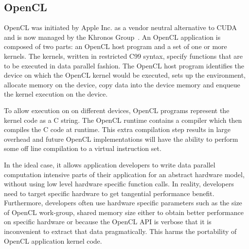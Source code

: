 
\subsection{OpenCL}

OpenCL was initiated by Apple Inc. as a vendor neutral alternative
to CUDA and is now managed by the Khronos Group~\cite{Khronos:url}.
An OpenCL application is composed of two parts: an OpenCL host program and a
set of one or more kernels. The kernels, written in restricted C99 syntax,
specify functions that are to be executed in data parallel fashion. The OpenCL
host program identifies the device on which the OpenCL kernel would be
executed, sets up the environment, allocate memory on the device, copy data
into the device memory and enqueue the kernel execution on the device.


To allow execution on on different devices, OpenCL programs represent the kernel
	code as a C string.
The OpenCL runtime contains a compiler which then compiles the C code at runtime.
This extra compilation step results in large overhead and future OpenCL implementations
will have the ability to perform some off line compilation to a virtual instruction
set.

In the ideal case, it allows application developers to write
data parallel computation intensive parts of their application for an abstract
hardware model, without using low level hardware specific function calls.
In reality, developers need to target specific hardware to get tangential
performance benefit. Furthermore, developers often use hardware specific 
parameters such as the size of OpenCL work-group, shared memory size either 
to obtain better performance on specific hardware or because the OpenCL API
is verbose that it is inconvenient to extract that data pragmatically.
This harms the portability of OpenCL application kernel code.

